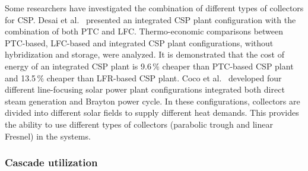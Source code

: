 
Some researchers have investigated the combination of different types of collectors for CSP.
Desai et al.~\cite{Desai2015} presented an integrated CSP plant configuration with the combination of both PTC and LFC. Thermo-economic comparisons between PTC-based, LFC-based and integrated CSP plant configurations, without hybridization and storage, were analyzed.  It is demonstrated that the cost of energy of an integrated CSP plant is 9.6$\,\%$ cheaper than PTC-based CSP plant and 13.5$\,\%$ cheaper than LFR-based CSP plant.
Coco et al.~\cite{Coco2015} developed four different line-focusing solar power plant configurations integrated both direct steam generation and Brayton power cycle. In these configurations, collectors are divided into different solar fields to supply different heat demands. This provides the ability to use different types of collectors (parabolic trough and linear Fresnel) in the systems.

\subsubsection{Cascade utilization}


